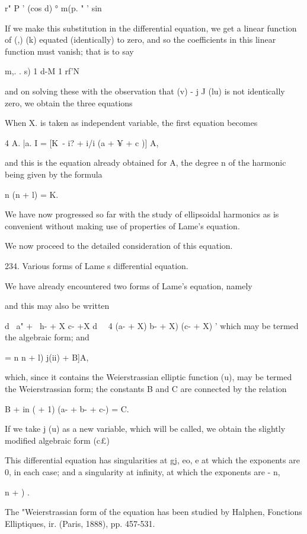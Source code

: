 {{{r" P ' (cos d) ° m(p. " ' sin

%
%

If we make this substitution in the differential equation, we get a
linear function of (,) (k) equated (identically) to zero, and so the
coefficients in this linear function must vanish; that is to say

m,. . s) 1 d-M 1 rf'N

and on solving these with the observation that (v) - j J (lu) is not
identically zero, we obtain the three equations

When X. is taken as independent variable, the first equation becomes

4 A. |a. I = [K\ - i? + i/i (a + ¥ + c )] A,

and this is the equation already obtained for A, the degree n of the
harmonic being given by the formula

n (n + l) = K.

We have now progressed so far with the study of ellipsoidal harmonics
as is convenient without making use of properties of Lame's equation.

We now proceed to the detailed consideration of this equation.

234. Various forms of Lame s differential equation.

We have already encountered two forms of Lame's equation, namely

and this may also be written

d \ a" + \ h- + X c- +X d\ ~ 4 (a- + X) b- + X) (c- + X) ' which may
be termed the algebraic form; and

  = n n + l) j(ii) + B]A,

which, since it contains the Weierstrassian elliptic function (u), may
be termed the Weierstrassian form; the constants B and C are
connected by the relation

B + in ( + 1) (a- + b- + c-) = C.

%
%

If we take j (u) as a new variable, which will be called, we obtain
the slightly modified algebraic form (c£)

This differential equation has singularities at gj, eo, e at which the
exponents are 0, in each case; and a singularity at infinity, at
which the exponents are - n,\ \ {n + ) .

The "Weierstrassian form of the equation has been studied by Halphen,
Fonctions Elliptiques, ir. (Paris, 1888), pp. 457-531.

}}}}
